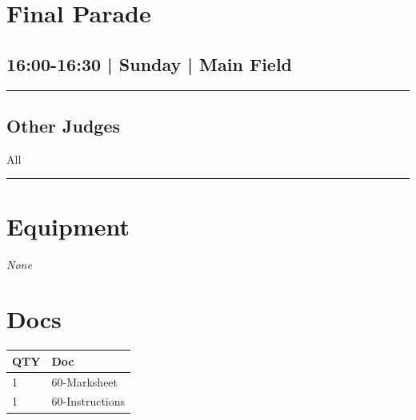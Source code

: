 \documentclass[10pt, A5]{article}
\begin{document}
        \begin{framed}
        \begin{minipage}{\textwidth}

        \setcounter{section}{91}
        \section{Final Parade}
        \subsection*{16:00-16:30 | Sunday | Main Field}

        \vspace{0.25cm}
        \hrule
        \vspace{0.25cm}


        \subsection*{Other Judges}
                    All

            \vspace{0.25cm}
        \hrule
        \vspace{0.25cm}

        \begin{multicols}{2}

		\section*{\faWrench \: Equipment}

				\textit{None}
		
		\vfill\null
		\columnbreak

			\section*{\faFile \: Docs}
		 	\begin{center}
			\begin{tabular}{p{2cm}p{4cm}}

			\textbf{QTY} & \textbf{Doc} \\\toprule
										1&60-Marksheet\\\midrule
										1&60-Instructions\\\midrule
							\end{tabular}
			\end{center}
	

		\vfill\null

		\end{multicols}
\end{minipage}
\end{framed}
\end{document}
